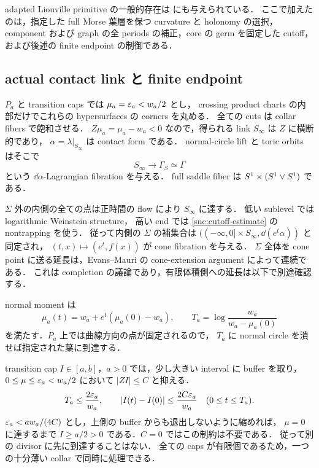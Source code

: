 adapted Liouville primitive の一般的存在は
\cite[Proposition 2.10]{BSV}にも与えられている．
ここで加えたのは，指定した full Morse 葉層を保つ curvature と holonomy の選択，
component および graph の全 periods の補正，core の germ を固定した cutoff，
および後述の finite endpoint の制御である．

\subsection{actual contact link と finite endpoint}

$P_a$ と transition caps では $\mu_a=\varepsilon_a<w_a/2$ とし，
crossing product charts の内部だけでこれらの hypersurfaces の corners を丸める．
全ての cuts は collar fibers で飽和させる．
$Z\mu_a=\mu_a-w_a<0$ なので，得られる link $S_\infty$ は $Z$ に横断的であり，
$\alpha=\lambda|_{S_\infty}$ は contact form である．
normal-circle lift と toric orbits はそこで
\[
 S_\infty\longrightarrow\Gamma_S\simeq\Gamma
\]
という $\dd\alpha$-Lagrangian fibration を与える．
full saddle fiber は $S^1\times(S^1\vee S^1)$ である．

$\Sigma$ 外の内側の全ての点は正時間の flow により $S_\infty$ に達する．
低い sublevel では logarithmic Weinstein structure，
高い end では \eqref{snc:cutoff-estimate} の nontrapping を使う．
従って内側の $\Sigma$ の補集合は
$((-\infty,0]\times S_\infty,\dd(e^t\alpha))$ と同定され，
$(t,x)\mapsto(e^t,f(x))$ が cone fibration を与える．
$\Sigma$ 全体を cone point に送る延長は，Evans--Mauri の cone-extension argument
\cite[Lemma 2.16]{EM}によって連続である．
これは completion の議論であり，有限体積側への延長は以下で別途確認する．

normal moment は
\begin{equation}\label{snc:time}
 \mu_a(t)=w_a+e^t(\mu_a(0)-w_a),\qquad
 T_a=\log\frac{w_a}{w_a-\mu_a(0)}
\end{equation}
を満たす．$P_a$ 上では曲線方向の点が固定されるので，
$T_a$ に normal circle を潰せば指定された葉に到達する．

transition cap $I\in[a,b]$，$a>0$ では，少し大きい interval に buffer を取り，
$0\leq\mu\leq\varepsilon_a<w_a/2$ において $|ZI|\leq C$ と抑える．
\[
 T_a\leq\frac{2\varepsilon_a}{w_a},\qquad
 |I(t)-I(0)|\leq\frac{2C\varepsilon_a}{w_a}\quad(0\leq t\leq T_a).
\]
$\varepsilon_a<a w_a/(4C)$ とし，上側の buffer からも退出しないように縮めれば，
$\mu=0$ に達するまで $I\geq a/2>0$ である．$C=0$ ではこの制約は不要である．
従って別の divisor に先に到達することはない．
全ての caps が有限個であるため，一つの十分薄い collar で同時に処理できる．

